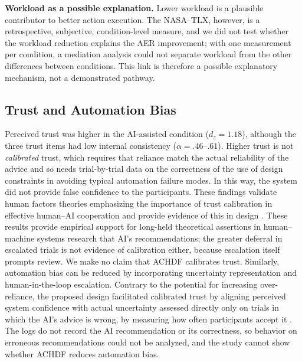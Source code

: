 \documentclass[journal]{IEEEtran}
\theoremstyle{plain}
\theoremstyle{definition}
\providecommand{\DIFaddtex}[1]{{\protect\color{blue} \sf #1}} %
\providecommand{\DIFdeltex}[1]{{\protect\color{red} \scriptsize #1}} %
\providecommand{\DIFaddbegin}{} %
\providecommand{\DIFaddend}{} %
\providecommand{\DIFdelbegin}{} %
\providecommand{\DIFdelend}{} %
\providecommand{\DIFadd}[1]{\texorpdfstring{\DIFaddtex{#1}}{#1}} %
\providecommand{\DIFdel}[1]{\texorpdfstring{\DIFdeltex{#1}}{}} %
\newcommand{\DIFscaledelfig}{0.5}
\newlength{\DIFdelgraphicswidth} %
\newlength{\DIFdelgraphicsheight} %
\newcommand{\DIFaddincludegraphics}[2][]{{\color{blue}\fbox{\DIFOincludegraphics[#1]{#2}}}} %
\newcommand{\DIFdelincludegraphics}[2][]{%
\sbox{\DIFdelgraphicsbox}{\DIFOincludegraphics[#1]{#2}}%
\settoboxwidth{\DIFdelgraphicswidth}{\DIFdelgraphicsbox} %
\settoboxtotalheight{\DIFdelgraphicsheight}{\DIFdelgraphicsbox} %
\scalebox{\DIFscaledelfig}{%
\parbox[b]{\DIFdelgraphicswidth}{\usebox{\DIFdelgraphicsbox}\\[-\baselineskip] \rule{\DIFdelgraphicswidth}{0em}}\llap{\resizebox{\DIFdelgraphicswidth}{\DIFdelgraphicsheight}{%
\setlength{\unitlength}{\DIFdelgraphicswidth}%
\begin{picture}(1,1)%
\thicklines\linethickness{2pt} %
{\color[rgb]{1,0,0}\put(0,0){\framebox(1,1){}}}%
{\color[rgb]{1,0,0}\put(0,0){\line( 1,1){1}}}%
{\color[rgb]{1,0,0}\put(0,1){\line(1,-1){1}}}%
\end{picture}%
}\hspace*{3pt}}} %
} %
\DeclareRobustCommand{\DIFaddbegin}{\DIFOaddbegin \let\includegraphics\DIFaddincludegraphics} %
\DeclareRobustCommand{\DIFaddend}{\DIFOaddend \let\includegraphics\DIFOincludegraphics} %
\DeclareRobustCommand{\DIFdelbegin}{\DIFOdelbegin \let\includegraphics\DIFdelincludegraphics} %
\DeclareRobustCommand{\DIFdelend}{\DIFOaddend \let\includegraphics\DIFOincludegraphics} %
\begin{document}
\DIFadd{\textbf{Workload as a possible explanation.} Lower workload is a plausible contributor to better action execution. The NASA--TLX, however, is a retrospective, subjective, condition-level measure, and we did not test whether the workload reduction explains the AER improvement; with one measurement per condition, a mediation analysis could not separate workload from the other differences between conditions. This link is therefore a possible explanatory mechanism, not a demonstrated pathway.
}

\subsection{\DIFadd{Trust and Automation Bias}}
\DIFadd{Perceived trust was higher in the AI-assisted condition ($d_z=1.18$), although the three trust items had low internal consistency ($\alpha = .46$--$.61$). Higher trust is not \emph{calibrated} trust, which requires that reliance match the actual reliability of the advice \cite{Lee2004} and so needs trial-by-trial data on the correctness of }\DIFaddend the \DIFdelbegin \DIFdel{use of design constraints in avoiding typical automation failure modes. In this way, the system did not provide false confidence to the participants. These findings validate human factors theories emphasizing the importance of trust calibration in effective human--AI cooperation and provide evidence of this in design \cite{Hodgson2013THMS,Bach2024Access}. These results provide empirical support for long-held theoretical assertions in human--machine systems research that }\DIFdelend \DIFaddbegin \DIFadd{AI's recommendations; the greater deferral in escalated trials is not evidence of calibration either, because escalation itself prompts review. We make no claim that ACHDF calibrates trust. Similarly, }\DIFaddend automation bias can be \DIFdelbegin \DIFdel{reduced by incorporating uncertainty representation and human-in-the-loop escalation. Contrary to the potential for increasing over-reliance, the proposed design facilitated calibrated trust by aligning perceived system confidence with actual uncertainty \cite{Miller2019XRDS,Weidinger2022FAccT,Lai2023FAccT}}\DIFdelend \DIFaddbegin \DIFadd{assessed directly only on trials in which the AI's advice is wrong, by measuring how often participants accept it \cite{Parasuraman2010}. The logs do not record the AI recommendation or its correctness, so behavior on erroneous recommendations could not be analyzed, and the study cannot show whether ACHDF reduces automation bias}\DIFaddend .
\end{document}
